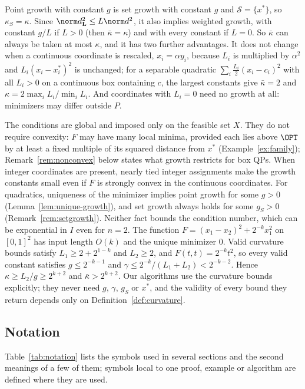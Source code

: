 Point growth with constant $g$ is set growth with constant $g$ and
$\mathcal S=\{x^*\}$, so $\kappa_S=\kappa$. Since $\norm d_{\mathbf L}^2\le
L\norm d^2$, it also implies weighted growth, with constant $g/L$ if $L>0$
(then $\bar\kappa=\kappa$) and with every constant if $L=0$. So $\bar\kappa$
can always be taken at most $\kappa$, and it has two further advantages. It
does not change when a continuous coordinate is rescaled, $x_i=\alpha y_i$,
because $L_i$ is multiplied by $\alpha^2$ and $L_i(x_i-x_i^*)^2$ is
unchanged; for a separable quadratic $\sum_i\frac{L_i}{2}(x_i-c_i)^2$ with
all $L_i>0$ on a continuous box containing $c$, the largest constants give
$\bar\kappa=2$ and $\kappa=2\max_iL_i/\min_iL_i$. And coordinates with
$L_i=0$ need no growth at all: minimizers may differ outside $P$.

The conditions are global and imposed only on the feasible set $X$. They do
not require convexity: $F$ may have many local minima, provided each lies above
$\OPT$ by at least a fixed multiple of its squared distance from $x^*$
(Example~\ref{ex:family}); Remark~\ref{rem:nonconvex} below states what
growth restricts for box QPs. When integer coordinates are present,
nearly tied integer assignments make the growth constants small even if $F$ is
strongly convex in the continuous coordinates. For quadratics, uniqueness of
the minimizer implies point growth for some $g>0$
(Lemma~\ref{lem:unique-growth}), and set growth always holds for some $g_S>0$
(Remark~\ref{rem:setgrowth}). Neither fact bounds the condition number, which
can be exponential in $I$ even for $n=2$. The function
$F=(x_1-x_2)^2+2^{-k}x_1^2$ on $[0,1]^2$ has input length $O(k)$ and the
unique minimizer $0$. Valid curvature bounds satisfy $L_1\ge2+2^{1-k}$ and
$L_2\ge2$, and $F(t,t)=2^{-k}t^2$, so every valid constant satisfies
$g\le2^{-k-1}$ and $\gamma\le2^{-k}/(L_1+L_2)<2^{-k-2}$. Hence
$\kappa\ge L_2/g\ge2^{k+2}$ and $\bar\kappa>2^{k+2}$. Our
algorithms use the curvature bounds explicitly; they never need $g$, $\gamma$,
$g_S$ or $x^*$, and the validity of every bound they return depends only on
Definition~\ref{def:curvature}.


\subsection{Notation}
Table~\ref{tab:notation} lists the symbols used in several sections and the
second meanings of a few of them; symbols local to one proof, example or
algorithm are defined where they are used.

